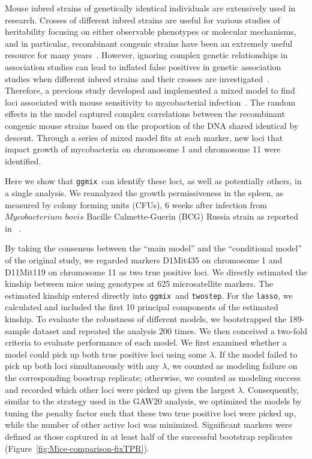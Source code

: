 \documentclass[10pt,letterpaper]{article}
\newcommand{\ggmix}{\texttt{ggmix}}
\begin{document}
	Mouse inbred strains of genetically identical individuals are extensively used in research.
	Crosses of different inbred strains are useful for various studies of heritability focusing on either observable phenotypes or molecular mechanisms, and in particular, recombinant congenic strains have been an extremely useful resource for many years~\cite{fortin2001recombinant}.
	However, ignoring complex genetic relationships in association studies can lead to inflated false positives in genetic association studies when different inbred strains and their crosses are investigated~\cite{bennett2010high,flint2012genome,cheng2010genome}.
	Therefore, a previous study developed and implemented a mixed model to find loci associated with mouse sensitivity to mycobacterial infection~\cite{di2010strain}. The random effects in the model captured complex correlations between the recombinant congenic mouse strains based on the proportion of the DNA shared identical by descent. Through a series of mixed model fits at each marker, new loci that impact growth of mycobacteria on chromosome 1 and chromosome 11 were identified.

	Here we show that \ggmix ~can identify these loci, as well as potentially others, in a single analysis. We reanalyzed the growth permissiveness in the spleen, as measured by colony forming units (CFUs), 6 weeks after infection from $Mycobacterium$ $bovis$ Bacille Calmette-Guerin (BCG) Russia strain as reported in ~\cite{di2010strain}.

	By taking the consensus between the ``main model'' and the ``conditional model'' of the original study, we regarded markers D1Mit435 on chromosome 1 and D11Mit119 on chromosome 11 as two true positive loci.
	We directly estimated the kinship between mice using genotypes at 625 microsatellite markers. The estimated kinship entered directly into \ggmix ~and \texttt{twostep}. For the \texttt{lasso}, we calculated and included the first 10 principal components of the estimated kinship. To evaluate the robustness of different models, we bootstrapped the 189-sample dataset and repeated the analysis 200 times. We then conceived a two-fold criteria to evaluate performance of each model. We first examined whether a model could pick up both true positive loci using some $\lambda$. If the model failed to pick up both loci simultaneously with any $\lambda$, we counted as modeling failure on the corresponding boostrap replicate; otherwise, we counted as modeling success and recorded which other loci were picked up given the largest $\lambda$. Consequently, similar to the strategy used in the GAW20 analysis, we optimized the models by tuning the penalty factor such that these two true positive loci were picked up, while the number of other active loci was minimized.
	Significant markers were defined as those captured in at least half of the successful bootstrap replicates (Figure~\ref{fig:Mice-comparison-fixTPR}).
\end{document}

